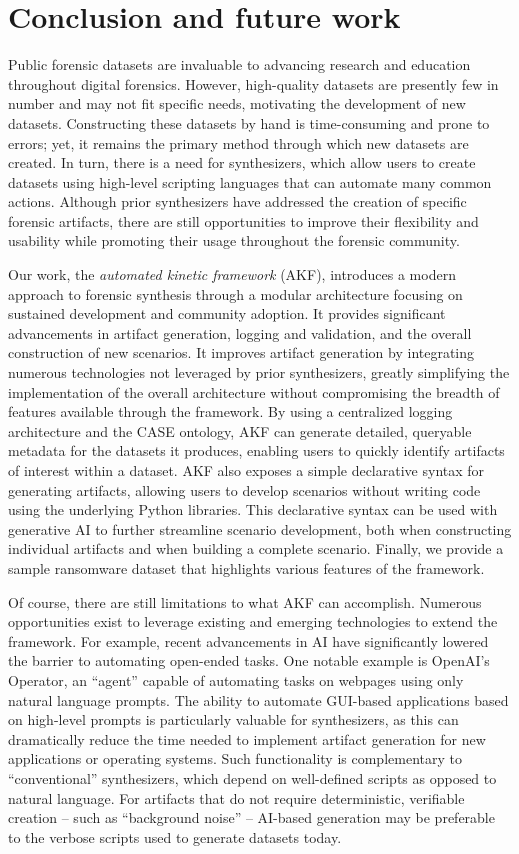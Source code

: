 \documentclass[final,5p,times,twocolumn]{elsarticle}
\begin{document}
\section{Conclusion and future work}\label{conclusion-and-future-work}

Public forensic datasets are invaluable to advancing research and
education throughout digital forensics. However, high-quality datasets
are presently few in number and may not fit specific needs, motivating
the development of new datasets. Constructing these datasets by hand is
time-consuming and prone to errors; yet, it remains the primary method
through which new datasets are created. In turn, there is a need for
synthesizers, which allow users to create datasets using high-level
scripting languages that can automate many common actions. Although
prior synthesizers have addressed the creation of specific forensic
artifacts, there are still opportunities to improve their flexibility
and usability while promoting their usage throughout the forensic
community.

Our work, the \emph{automated kinetic framework} (AKF), introduces a
modern approach to forensic synthesis through a modular architecture
focusing on sustained development and community adoption. It provides
significant advancements in artifact generation, logging and validation,
and the overall construction of new scenarios. It improves artifact
generation by integrating numerous technologies not leveraged by prior
synthesizers, greatly simplifying the implementation of the overall
architecture without compromising the breadth of features available
through the framework. By using a centralized logging architecture and
the CASE ontology, AKF can generate detailed, queryable metadata for the
datasets it produces, enabling users to quickly identify artifacts of
interest within a dataset. AKF also exposes a simple declarative syntax
for generating artifacts, allowing users to develop scenarios without
writing code using the underlying Python libraries. This declarative
syntax can be used with generative AI to further streamline scenario
development, both when constructing individual artifacts and when
building a complete scenario. Finally, we provide a sample ransomware
dataset that highlights various features of the framework.

Of course, there are still limitations to what AKF can accomplish.
Numerous opportunities exist to leverage existing and emerging
technologies to extend the framework. For example, recent advancements
in AI have significantly lowered the barrier to automating open-ended
tasks. One notable example is OpenAI's Operator, an ``agent'' capable of
automating tasks on webpages using only natural language prompts. The
ability to automate GUI-based applications based on high-level prompts
is particularly valuable for synthesizers, as this can dramatically
reduce the time needed to implement artifact generation for new
applications or operating systems. Such functionality is complementary
to ``conventional'' synthesizers, which depend on well-defined scripts
as opposed to natural language. For artifacts that do not require
deterministic, verifiable creation -- such as ``background noise'' --
AI-based generation may be preferable to the verbose scripts used to
generate datasets today.
\end{document}

